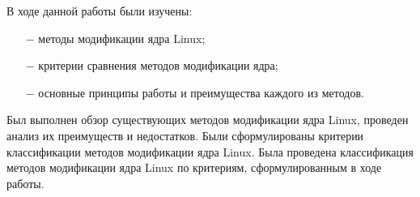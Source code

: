 
В ходе данной работы были изучены:
\begin{itemize}
    \item[$-$] методы модификации ядра Linux;
    \item[$-$] критерии сравнения методов модификации ядра;
    \item[$-$] основные принципы работы и преимущества каждого из методов.
\end{itemize}

\indent Был выполнен обзор существующих методов модификации ядра Linux, проведен анализ их преимуществ и недостатков.
Были сформулированы критерии классификации методов модификации ядра Linux.
Была проведена классификация методов модификации ядра Linux по критериям, сформулированным в ходе работы.
